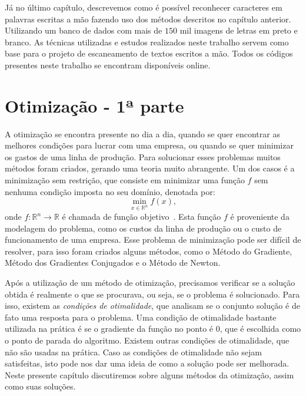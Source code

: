 \documentclass[
	12pt,				%
    oneside,			%
	a4paper,			%
	english,			%
	french,				%
	spanish,			%
	brazil,				%
	]{abntex2}
\begin{document}
    Já no último capítulo, descrevemos como é possível reconhecer caracteres em palavras escritas a mão fazendo uso dos métodos descritos no capítulo anterior. Utilizando um banco de dados com mais de $150$ mil imagens de letras em preto e branco. As técnicas utilizadas e estudos realizados neste trabalho servem como base para o projeto de escaneamento de textos escritos a mão. Todos os códigos presentes neste trabalho se encontram disponíveis online.


\chapter{Otimização - 1ª parte}

    A otimização se encontra presente no dia a dia, quando se quer encontrar as melhores condições para lucrar com uma empresa, ou quando se quer minimizar os gastos de uma linha de produção. Para solucionar esses problemas muitos métodos foram criados, gerando uma teoria muito abrangente. Um dos casos é a minimização sem restrição, que consiste em minimizar uma função $f$ sem nenhuma condição imposta no seu domínio, denotada por:
    \begin{equation*}
        \min_{x \in \mathbb{R}^n} f(x)
        ,
    \end{equation*}
    onde $f: \mathbb{R}^n \to \mathbb{R}$ é chamada de função objetivo~\cite{nocedal}.
    Esta função $f$ é proveniente da modelagem do problema, como os custos da linha de produção ou o custo de funcionamento de uma empresa. Esse problema de minimização pode ser difícil de resolver, para isso foram criados alguns métodos, como o Método do Gradiente, Método dos Gradientes Conjugados e o Método de Newton.

    Após a utilização de um método de otimização, precisamos verificar se a solução obtida é realmente o que se procurava, ou seja, se o problema é solucionado. Para isso, existem as \emph{condições de otimalidade}, que analisam se o conjunto solução é de fato uma resposta para o problema. Uma condição de otimalidade bastante utilizada na prática é se o gradiente da função no ponto é $0$, que é escolhida como o ponto de parada do algoritmo. Existem outras condições de otimalidade, que não são usadas na prática. Caso as condições de otimalidade não sejam satisfeitas, isto pode nos dar uma ideia de como a solução pode ser melhorada.
    Neste presente capítulo discutiremos sobre alguns métodos da otimização, assim como suas soluções.
\end{document}
